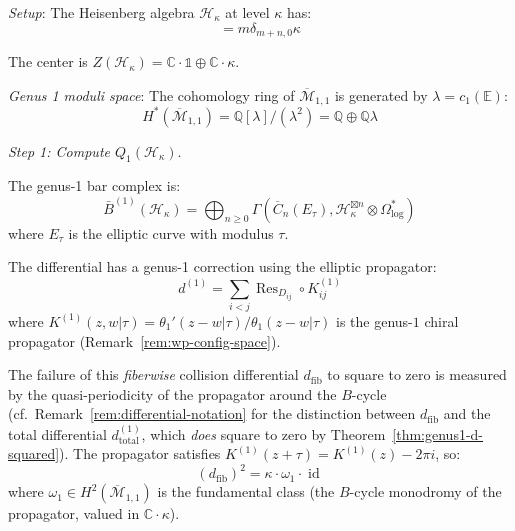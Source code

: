 \begin{example}
\label{ex:heisenberg-complementarity-explicit}

\emph{Setup}: The Heisenberg algebra $\mathcal{H}_\kappa$ at level $\kappa$ has:
\begin{equation}
[a_m, a_n] = m\delta_{m+n,0} \kappa
\end{equation}

The center is $Z(\mathcal{H}_\kappa) = \mathbb{C} \cdot \mathbb{1} \oplus \mathbb{C} 
\cdot \kappa$.

\emph{Genus 1 moduli space}: The cohomology ring of $\overline{\mathcal{M}}_{1,1}$ is generated by $\lambda = c_1(\mathbb{E})$:
\begin{equation}
H^*(\overline{\mathcal{M}}_{1,1}) = \mathbb{Q}[\lambda] / (\lambda^2) = \mathbb{Q} 
\oplus \mathbb{Q}\lambda
\end{equation}

\emph{Step 1: Compute $Q_1(\mathcal{H}_\kappa)$}.

The genus-1 bar complex is:
\begin{equation}
\bar{B}^{(1)}(\mathcal{H}_\kappa) = \bigoplus_{n \geq 0} \Gamma(\overline{C}_n(E_\tau), 
\mathcal{H}_\kappa^{\boxtimes n} \otimes \Omega^*_{\log})
\end{equation}
where $E_\tau$ is the elliptic curve with modulus $\tau$.

The differential has a genus-1 correction using the elliptic propagator:
\begin{equation}
d^{(1)} = \sum_{i<j} \operatorname{Res}_{D_{ij}} \circ K^{(1)}_{ij}
\end{equation}
where $K^{(1)}(z,w|\tau) = \theta_1'(z-w|\tau)/\theta_1(z-w|\tau)$ is the genus-$1$ chiral propagator (Remark~\ref{rem:wp-config-space}).

The failure of this \emph{fiberwise} collision differential $d_{\mathrm{fib}}$
to square to zero is measured by the quasi-periodicity of the propagator
around the $B$-cycle
(cf.\ Remark~\ref{rem:differential-notation} for the distinction between
$d_{\mathrm{fib}}$ and the total differential $d^{(1)}_{\mathrm{total}}$,
which \emph{does} square to zero by Theorem~\ref{thm:genus1-d-squared}).
The propagator satisfies $K^{(1)}(z+\tau) = K^{(1)}(z) - 2\pi i$, so:
\begin{equation}
(d_{\mathrm{fib}})^2 = \kappa \cdot \omega_1 \cdot \operatorname{id}
\end{equation}
where $\omega_1 \in H^2(\overline{\mathcal{M}}_{1,1})$ is the fundamental class (the $B$-cycle monodromy of the propagator, valued in $\mathbb{C} \cdot \kappa$).


\end{example}
